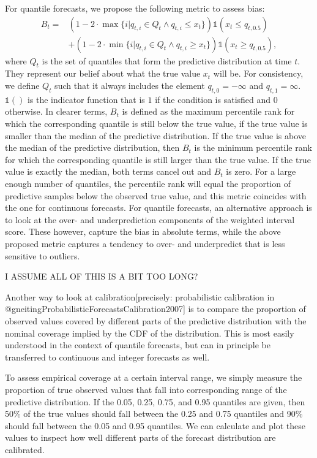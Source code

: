 \documentclass[article]{jss}
\begin{document}
For quantile forecasts, we propose the following metric to assess bias: 
\begin{align*}
  B_t =& (1 - 2 \cdot \max \{i | q_{t,i} \in Q_t \land q_{t,i} \leq x_t\}) \mathbb{1}( x_t \leq q_{t, 0.5}) \\
  &+ (1 - 2 \cdot \min \{i | q_{t,i} \in Q_t \land q_{t,i} \geq x_t\}) \mathbb{1}( x_t \geq q_{t, 0.5}),
\end{align*}
where $Q_t$ is the set of quantiles that form the predictive distribution at time $t$. They represent our belief about what the true value $x_t$ will be. For consistency, we define $Q_t$ such that it always includes the element $q_{t, 0} = - \infty$ and $q_{t,1} = \infty$. $\mathbb{1}()$ is the indicator function that is $1$ if the condition is satisfied and $0$ otherwise. In clearer terms, $B_t$ is defined as the maximum percentile rank for which the corresponding quantile is still below the true value, if the true value is smaller than the median of the predictive distribution. If the true value is above the median of the predictive distribution, then $B_t$ is the minimum percentile rank for which the corresponding quantile is still larger than the true value. If the true value is exactly the median, both terms cancel out and $B_t$ is zero. For a large enough number of quantiles, the percentile rank will equal the proportion of predictive samples below the observed true value, and this metric coincides with the one for continuous forecasts. For quantile forecasts, an alternative approach is to look at the over- and underprediction components of the weighted interval score. These however, capture the bias in absolute terms, while the above proposed metric captures a tendency to over- and underpredict that is less sensitive to outliers. 

I ASSUME ALL OF THIS IS A BIT TOO LONG? 


Another way to look at calibration[precisely: probabilistic calibration in @gneitingProbabilisticForecastsCalibration2007] is to compare the proportion of observed values covered by different parts of the predictive distribution with the nominal coverage implied by the CDF of the distribution. This is most easily understood in the context of quantile forecasts, but can in principle be transferred to continuous and integer forecasts as well. 

To assess empirical coverage at a certain interval range, we simply measure the proportion of true observed values that fall into corresponding range of the predictive distribution. If the 0.05, 0.25, 0.75, and 0.95 quantiles are given, then 50\% of the true values should fall between the 0.25 and 0.75 quantiles and 90\% should fall between the 0.05 and 0.95 quantiles. We can calculate and plot these values to inspect how well different parts of the forecast distribution are calibrated. 
\end{document}
